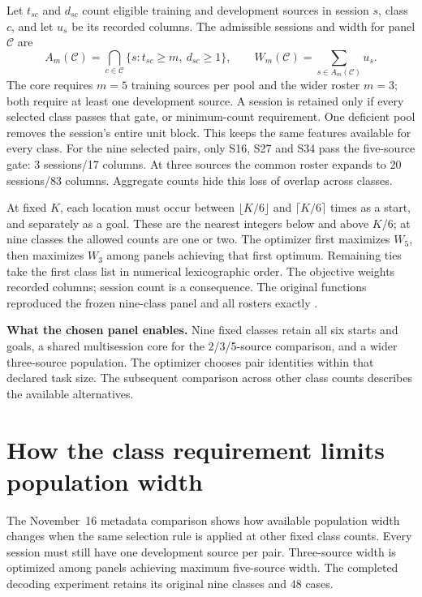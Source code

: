 \documentclass[10pt,a4paper]{article}
\newcommand{\key}[1]{\vspace{3pt}\noindent\colorbox{wash}{\parbox{\dimexpr\linewidth-2\fboxsep\relax}{\small #1}}\vspace{3pt}}
\begin{document}
Let $t_{sc}$ and $d_{sc}$ count eligible training and development sources in session $s$, class $c$, and let $u_s$ be its recorded columns. The admissible sessions and width for panel $\mathcal C$ are
\begin{equation}
 A_m(\mathcal C)=\bigcap_{c\in\mathcal C}\{s:t_{sc}\ge m,\ d_{sc}\ge1\},
 \qquad W_m(\mathcal C)=\sum_{s\in A_m(\mathcal C)}u_s .
\label{eq:panel-intersection}
\end{equation}
The core requires $m=5$ training sources per pool and the wider roster $m=3$; both require at least one development source. A session is retained only if every selected class passes that gate, or minimum-count requirement. One deficient pool removes the session's entire unit block. This keeps the same features available for every class. For the nine selected pairs, only S16, S27 and S34 pass the five-source gate: 3 sessions/17 columns. At three sources the common roster expands to 20 sessions/83 columns. Aggregate counts hide this loss of overlap across classes.

At fixed $K$, each location must occur between $\lfloor K/6\rfloor$ and $\lceil K/6\rceil$ times as a start, and separately as a goal. These are the nearest integers below and above $K/6$; at nine classes the allowed counts are one or two. The optimizer first maximizes $W_5$, then maximizes $W_3$ among panels achieving that first optimum. Remaining ties take the first class list in numerical lexicographic order. The objective weights recorded columns; session count is a consequence. The original functions reproduced the frozen nine-class panel and all rosters exactly \cite{panel}.

\key{\textbf{What the chosen panel enables.} Nine fixed classes retain all six starts and goals, a shared multisession core for the 2/3/5-source comparison, and a wider three-source population. The optimizer chooses pair identities within that declared task size. The subsequent comparison across other class counts describes the available alternatives.}

\clearpage
\section{How the class requirement limits population width}
The November~16 metadata comparison shows how available population width changes when the same selection rule is applied at other fixed class counts. Every session must still have one development source per pair. Three-source width is optimized among panels achieving maximum five-source width. The completed decoding experiment retains its original nine classes and 48 cases.
\end{document}
